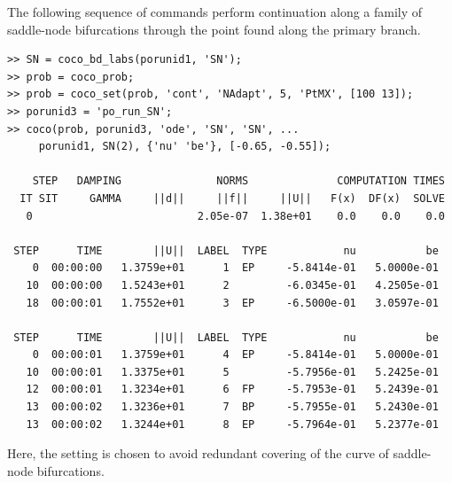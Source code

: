 The following sequence of commands perform continuation along a family of saddle-node bifurcations through the point found along the primary branch.
\begin{lstlisting}[language=coco-highlight,frame=lines]
>> SN = coco_bd_labs(porunid1, 'SN');
>> prob = coco_prob;
>> prob = coco_set(prob, 'cont', 'NAdapt', 5, 'PtMX', [100 13]);
>> porunid3 = 'po_run_SN';
>> coco(prob, porunid3, 'ode', 'SN', 'SN', ...
     porunid1, SN(2), {'nu' 'be'}, [-0.65, -0.55]);

    STEP   DAMPING               NORMS              COMPUTATION TIMES
  IT SIT     GAMMA     ||d||     ||f||     ||U||   F(x)  DF(x)  SOLVE
   0                          2.05e-07  1.38e+01    0.0    0.0    0.0

 STEP      TIME        ||U||  LABEL  TYPE            nu           be
    0  00:00:00   1.3759e+01      1  EP     -5.8414e-01   5.0000e-01
   10  00:00:00   1.5243e+01      2         -6.0345e-01   4.2505e-01
   18  00:00:01   1.7552e+01      3  EP     -6.5000e-01   3.0597e-01

 STEP      TIME        ||U||  LABEL  TYPE            nu           be
    0  00:00:01   1.3759e+01      4  EP     -5.8414e-01   5.0000e-01
   10  00:00:01   1.3375e+01      5         -5.7956e-01   5.2425e-01
   12  00:00:01   1.3234e+01      6  FP     -5.7953e-01   5.2439e-01
   13  00:00:02   1.3236e+01      7  BP     -5.7955e-01   5.2430e-01
   13  00:00:02   1.3244e+01      8  EP     -5.7964e-01   5.2377e-01
\end{lstlisting}
Here, the  setting is chosen to avoid redundant covering of the curve of saddle-node bifurcations.

